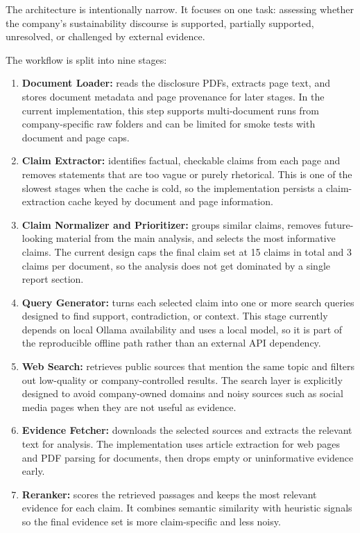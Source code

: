 The architecture is intentionally narrow. It focuses on one task: assessing whether the company's sustainability discourse is supported, partially supported, unresolved, or challenged by external evidence.

The workflow is split into nine stages:

\begin{enumerate}
    \item \textbf{Document Loader:} reads the disclosure PDFs, extracts page text, and stores document metadata and page provenance for later stages. In the current implementation, this step supports multi-document runs from company-specific raw folders and can be limited for smoke tests with document and page caps.
    \item \textbf{Claim Extractor:} identifies factual, checkable claims from each page and removes statements that are too vague or purely rhetorical. This is one of the slowest stages when the cache is cold, so the implementation persists a claim-extraction cache keyed by document and page information.
    \item \textbf{Claim Normalizer and Prioritizer:} groups similar claims, removes future-looking material from the main analysis, and selects the most informative claims. The current design caps the final claim set at 15 claims in total and 3 claims per document, so the analysis does not get dominated by a single report section.
    \item \textbf{Query Generator:} turns each selected claim into one or more search queries designed to find support, contradiction, or context. This stage currently depends on local Ollama availability and uses a local model, so it is part of the reproducible offline path rather than an external API dependency.
    \item \textbf{Web Search:} retrieves public sources that mention the same topic and filters out low-quality or company-controlled results. The search layer is explicitly designed to avoid company-owned domains and noisy sources such as social media pages when they are not useful as evidence.
    \item \textbf{Evidence Fetcher:} downloads the selected sources and extracts the relevant text for analysis. The implementation uses article extraction for web pages and PDF parsing for documents, then drops empty or uninformative evidence early.
    \item \textbf{Reranker:} scores the retrieved passages and keeps the most relevant evidence for each claim. It combines semantic similarity with heuristic signals so the final evidence set is more claim-specific and less noisy.

\end{enumerate}

